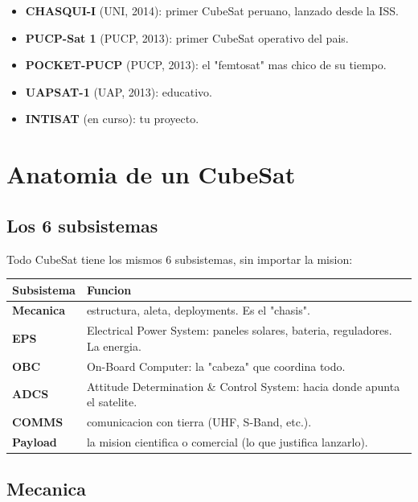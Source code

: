 \documentclass[11pt,a4paper,oneside,openright]{book}
\begin{document}
\begin{itemize}[leftmargin=2em]
  \item \textbf{CHASQUI-I} (UNI, 2014): primer CubeSat peruano, lanzado
        desde la ISS.
  \item \textbf{PUCP-Sat 1} (PUCP, 2013): primer CubeSat operativo del pais.
  \item \textbf{POCKET-PUCP} (PUCP, 2013): el "femtosat" mas chico de su tiempo.
  \item \textbf{UAPSAT-1} (UAP, 2013): educativo.
  \item \textbf{INTISAT} (en curso): tu proyecto.
\end{itemize}

\chapter{Anatomia de un CubeSat}
\label{ch:anatomia}

\section{Los 6 subsistemas}

Todo CubeSat tiene los mismos 6 subsistemas, sin importar la mision:

\begin{center}
\begin{tabular}{p{2.5cm}p{12.5cm}}
\toprule
\textbf{Subsistema} & \textbf{Funcion} \\
\midrule
\textbf{Mecanica}   & estructura, aleta, deployments. Es el "chasis". \\
\textbf{EPS}        & Electrical Power System: paneles solares, bateria,
                      reguladores. La energia. \\
\textbf{OBC}        & On-Board Computer: la "cabeza" que coordina todo. \\
\textbf{ADCS}       & Attitude Determination \& Control System: hacia
                      donde apunta el satelite. \\
\textbf{COMMS}      & comunicacion con tierra (UHF, S-Band, etc.). \\
\textbf{Payload}    & la mision cientifica o comercial (lo que justifica
                      lanzarlo). \\
\bottomrule
\end{tabular}
\end{center}

\section{Mecanica}
\end{document}
